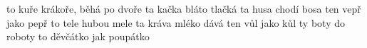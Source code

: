 \begin{multicols}{2}
\begin{kdyz-jsem-ja-slouzil}
   {to kuře krákoře, běhá po dvoře}
 {ta kačka bláto tlačká}
   {ta husa chodí bosa}
   {ten vepř jako pepř}
   {to tele hubou mele}
  {ta kráva mléko dává}
   {ten vůl jako kůl}
   {ty boty do roboty}
  {to děvčátko jak poupátko}
\end{kdyz-jsem-ja-slouzil}
\end{multicols}
